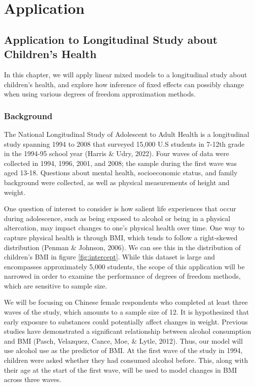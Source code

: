 \documentclass[12pt, twoside]{amherstthesis}
\begin{document}
\hypertarget{math-sci}{%
\chapter{Application}\label{math-sci}}

\hypertarget{application-to-longitudinal-study-about-childrens-health}{%
\section{Application to Longitudinal Study about Children's Health}\label{application-to-longitudinal-study-about-childrens-health}}

In this chapter, we will apply linear mixed models to a longitudinal study about children's health, and explore how inference of fixed effects can possibly change when using various degrees of freedom approximation methods.

\hypertarget{background}{%
\subsection{Background}\label{background}}

The National Longitudinal Study of Adolescent to Adult Health is a longitudinal study spanning 1994 to 2008 that surveyed 15,000 U.S students in 7-12th grade in the 1994-95 school year (Harris \& Udry, 2022). Four waves of data were collected in 1994, 1996, 2001, and 2008; the sample during the first wave was aged 13-18. Questions about mental health, socioeconomic status, and family background were collected, as well as physical measurements of height and weight.

One question of interest to consider is how salient life experiences that occur during adolescence, such as being exposed to alcohol or being in a physical altercation, may impact changes to one's physical health over time. One way to capture physical health is through BMI, which tends to follow a right-skewed distribution (Penman \& Johnson, 2006). We can see this in the distribution of children's BMI in figure \ref{fig:intercept}. While this dataset is large and encompasses approximately 5,000 students, the scope of this application will be narrowed in order to examine the performance of degrees of freedom methods, which are sensitive to sample size.

We will be focusing on Chinese female respondents who completed at least three waves of the study, which amounts to a sample size of 12. It is hypothesized that early exposure to substances could potentially affect changes in weight. Previous studies have demonstrated a significant relationship between alcohol consumption and BMI (Pasch, Velazquez, Cance, Moe, \& Lytle, 2012). Thus, our model will use alcohol use as the predictor of BMI.
At the first wave of the study in 1994, children were asked whether they had consumed alcohol before. This, along with their age at the start of the first wave, will be used to model changes in BMI across three waves.
\end{document}
